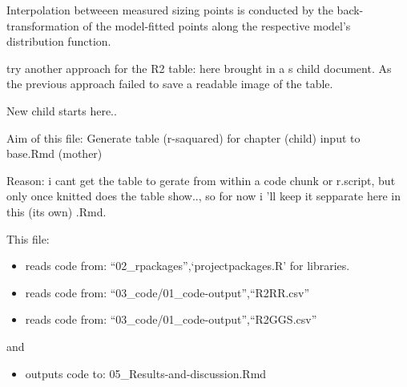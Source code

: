 \documentclass[
]{article}
\providecommand{\tightlist}{%
  \setlength{\itemsep}{0pt}\setlength{\parskip}{0pt}}
\begin{document}
Interpolation betweeen measured sizing points is conducted by the
back-transformation of the model-fitted points along the respective
model's distribution function.

try another approach for the R2 table: here brought in a s child
document. As the previous approach failed to save a readable image of
the table.

New child starts here..

Aim of this file: Generate table (r-saquared) for chapter (child) input
to base.Rmd (mother)

Reason: i cant get the table to gerate from within a code chunk or
r.script, but only once knitted does the table show.., so for now i 'll
keep it sepparate here in this (its own) .Rmd.

This file:

\begin{itemize}
\tightlist
\item
  reads code from: ``02\_rpackages'',`projectpackages.R' for libraries.
\item
  reads code from: ``03\_code/01\_code-output'',``R2RR.csv''
\item
  reads code from: ``03\_code/01\_code-output'',``R2GGS.csv''
\end{itemize}

and

\begin{itemize}
\tightlist
\item
  outputs code to: 05\_Results-and-discussion.Rmd
\end{itemize}
\end{document}
